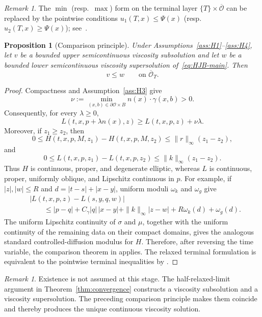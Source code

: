\documentclass[11pt]{article}
\newtheorem{proposition}[theorem]{Proposition}
\theoremstyle{definition}
\theoremstyle{remark}
\newtheorem{remark}[theorem]{Remark}
\newcommand{\cO}{\mathcal{O}}
\begin{document}
	\begin{remark} \upshape The $\min$ (resp.\ $\max$) form on the terminal layer $\{T\}\times\overline{\cO}$ can be replaced by the pointwise conditions $u_1(T,x)\le\Psi(x)$ (resp.\ $u_2(T,x)\ge\Psi(x)$); see~\cite[Proposition~6]{Bourgoing2008}.
	\end{remark}
	\begin{proposition}[Comparison principle] \upshape\label{thm:wellposed}
		Under Assumptions~\ref{ass:H1}--\ref{ass:H4}, let $v$ be a bounded
		upper semicontinuous viscosity subsolution and let $w$ be a bounded lower
		semicontinuous viscosity supersolution of~\eqref{eq:HJB-main}.  Then
		\[
		v\le w\qquad\text{on }\overline{\cO}_T.
		\]
	\end{proposition}
	\begin{proof}
		Compactness and Assumption~\ref{ass:H3} give
		\[
		\nu:=\min_{(x,b)\in\partial\cO\times B}
		n(x)\cdot\gamma(x,b)>0.
		\]
		Consequently, for every $\lambda\ge0$,
		\[
		L(t,x,p+\lambda n(x),z)
		\ge L(t,x,p,z)+\nu\lambda .
		\]
		Moreover, if $z_1\ge z_2$, then
		\[
		0\le H(t,x,p,M,z_1)-H(t,x,p,M,z_2)
		\le \|r\|_\infty(z_1-z_2),
		\]
		and
		\[
		0\le L(t,x,p,z_1)-L(t,x,p,z_2)
		\le \|k\|_\infty(z_1-z_2).
		\]
		Thus $H$ is continuous, proper, and degenerate elliptic, whereas $L$ is
		continuous, proper, uniformly oblique, and Lipschitz continuous in $p$.
		For example, if $|z|,|w|\le R$ and $d=|t-s|+|x-y|$, uniform moduli
		$\omega_k$ and $\omega_g$ give
		\begin{align*}
		&|L(t,x,p,z)-L(s,y,q,w)|\\
		&\qquad\le |p-q|+C_\gamma|q|\,|x-y|
		+\|k\|_\infty|z-w|+R\omega_k(d)+\omega_g(d).
		\end{align*}
		The uniform Lipschitz continuity of $\sigma$ and $\mu$, together with the
		uniform continuity of the remaining data on their compact domains, gives
		the analogous standard controlled-diffusion modulus for $H$.  Therefore,
		after reversing the
		time variable, the comparison theorem in
		\cite[Theorem~II.1]{Barles1993} applies.  The relaxed terminal formulation
		is equivalent to the pointwise terminal inequalities by
		\cite[Proposition~6]{Bourgoing2008}.
	\end{proof}
	\begin{remark} \upshape
		Existence is not assumed at this stage.  The half-relaxed-limit argument in
		Theorem~\ref{thm:convergence} constructs a viscosity subsolution and a
		viscosity supersolution.  The preceding comparison principle makes them
		coincide and thereby produces the unique continuous viscosity solution.
	\end{remark}
	
\end{document}
